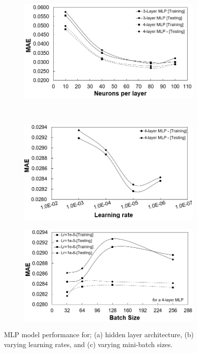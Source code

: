 \documentclass[a4paper,fleqn]{cas-dc}
\begin{document}
\begin{figure}[h!]
\centering
    \begin{subfigure}{0.5\textwidth}
    \includegraphics[width=1\textwidth]{NEURONS_HYPER}
    \caption{}
    \end{subfigure}\\
        \begin{subfigure}{0.5\textwidth}
    \includegraphics[width=1\textwidth]{LR_HYPER}
    \caption{}
    \end{subfigure}
        \begin{subfigure}{0.5\textwidth}
    \includegraphics[width=1\textwidth]{BATCH_SIZE_HYPER}
    \caption{}
    \end{subfigure}
    \caption{MLP model performance for; (a) hidden layer architecture, (b) varying learning rates, and (c) varying mini-batch sizes.}\label{fig_mlp_hyper}
\end{figure}
\end{document}
